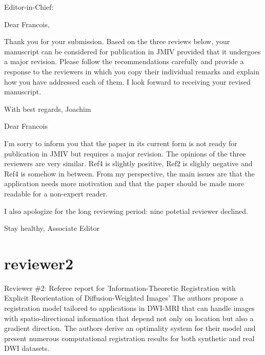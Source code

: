 \documentclass[11pt,a4paper]{article}
\begin{document}
Editor-in-Chief:

Dear Francois,

Thank you for your submission. Based on the three reviews below, your manuscript can be considered for publication in JMIV provided that it undergoes a major revision. Please follow the recommendations carefully and provide a response to the reviewers in which you copy their individual remarks and explain how you have addressed each of them. I look forward to receiving your revised manuscript.

With best regards,
Joachim


Dear Francois

I'm sorry to inform you that the paper in its current form is not ready for publication in JMIV but requires a major revision. The opinions of the three reviewers are very similar. Ref4 is slightly positive, Ref2 is slighly negative and Ref4 is somehow in between. From my perspective, the main issues are that the application needs more motivation and that the paper should be made more readable for a non-expert reader.

I also apologize for the long reviewing period: nine potetial reviewer declined.

Stay healthy,
Associate Editor




\section{reviewer2}
Reviewer \#2: Referee report for 'Information-Theoretic Registration with Explicit Reorientation of Diffusion-Weighted Images'
The authors propose a registration model tailored to applications in DWI-MRI that can handle images with spatio-directional information that depend not only on location but also a gradient direction. The authors derive an optimality system for their model and present numerous computational registration results for both synthetic and real DWI datasets.
\end{document}
